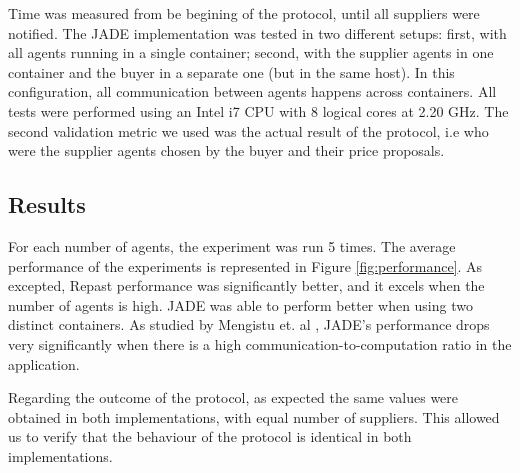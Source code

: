 Time was measured from be begining of the protocol, until all suppliers were notified. The JADE implementation was tested in two different setups: first, with all agents running in a single container; second, with the supplier agents in one container and the buyer in a separate one (but in the same host). In this configuration, all communication between agents happens across containers. All tests were performed using an Intel i7 CPU with 8 logical cores at 2.20 GHz. The second validation metric we used was the actual result of the protocol, i.e who were the supplier agents chosen by the buyer and their price proposals.

\subsection{Results}

For each number of agents, the experiment was run 5 times. The average performance of the experiments is represented in Figure \ref{fig:performance}. As excepted, Repast performance was significantly better, and it excels when the number of agents is high. JADE was able to perform better when using two distinct containers. As studied by Mengistu et. al \cite{mengistu2008scalability}, JADE's performance drops very significantly when there is a high communication-to-computation ratio in the application.

Regarding the outcome of the protocol, as expected the same values were obtained in both implementations, with equal number of suppliers. This allowed us to verify that the behaviour of the protocol is identical in both implementations.




